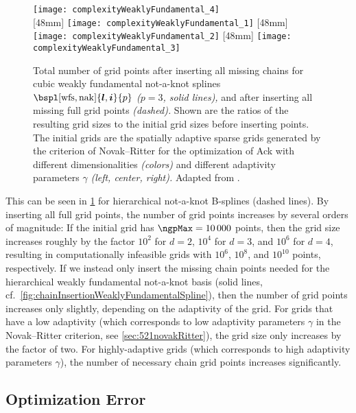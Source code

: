 \begin{figure}
  \texttt{[image: complexityWeaklyFundamental\_4]}\\[2mm]%
  [48mm]{%
    \texttt{[image: complexityWeaklyFundamental\_1]}%
  }%
  \hfill%
  [48mm]{%
    \texttt{[image: complexityWeaklyFundamental\_2]}%
  }%
  \hfill%
  [48mm]{%
    \texttt{[image: complexityWeaklyFundamental\_3]}%
  }%
  \caption[Complexity of weakly fundamental splines]{%
    Total number of grid points after inserting all missing chains
    for cubic weakly fundamental not-a-knot splines
    $\bspl[\wfs,\nak]{\*l,\*i}{p}$ \emph{($p = 3$, solid lines),}
    and after inserting all missing full grid points \emph{(dashed).}
    Shown are the ratios of the resulting grid sizes to the
    initial grid sizes before inserting points.
    The initial grids are the spatially adaptive sparse grids generated
    by the criterion of Novak--Ritter for the optimization of Ack with
    different dimensionalities \emph{(colors)} and
    different adaptivity parameters $\gamma$ \emph{(left, center, right).}
    Adapted from \cite{Valentin18Fundamental}.%
  }%
  \label{fig:complexityWeaklyFundamental}%
\end{figure}

This can be seen in \cref{fig:complexityWeaklyFundamental}
for hierarchical not-a-knot B-splines (dashed lines).
By inserting all full grid points,
the number of grid points increases by several orders of magnitude:
If the initial grid has $\ngpMax = \num{10000}$ points,
then the grid size increases roughly by the factor $10^2$ for $d = 2$,
$10^4$ for $d = 3$, and $10^6$ for $d = 4$,
resulting in computationally infeasible
grids with $10^6$, $10^8$, and $10^{10}$ points, respectively.
If we instead only insert the missing chain points needed for the
hierarchical weakly fundamental not-a-knot basis
(solid lines, cf.\ \cref{fig:chainInsertionWeaklyFundamentalSpline}),
then the number of grid points increases only slightly,
depending on the adaptivity of the grid.
For grids that have a low adaptivity (which corresponds
to low adaptivity parameters $\gamma$ in the Novak--Ritter criterion,
see \cref{sec:521novakRitter}), the grid size only increases by the
factor of two.
For highly-adaptive grids
(which corresponds to high adaptivity parameters $\gamma$),
the number of necessary chain grid points increases significantly.



\subsection{Optimization Error}
\label{sec:542optimization}


